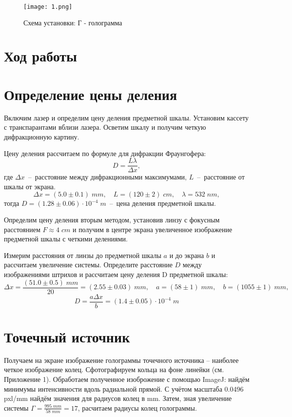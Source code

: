 \documentclass[a4paper, 12pt]{article}
\begin{document}
\begin{figure}[H]
	\centering
	\texttt{[image: 1.png]}
	\caption{Схема установки: Г - голограмма}
\end{figure}



\section*{Ход работы}
\section{Определение цены деления}
\noindent Включим лазер и определим цену деления предметной шкалы. Установим кассету с транспарантами вблизи лазера. Осветим шкалу и получим четкую дифракционную картину. 

\noindent Цену деления рассчитаем по формуле для дифракции Фраунгофера: 
\[ D = \dfrac{L\lambda}{\Delta x}, \] 
\noindent где $\Delta x$~--~расстояние между дифракционными максимумами, $L$~--~расстояние от шкалы от экрана.
\[\Delta x = (5.0\pm 0.1) \; mm, \quad L = (120\pm2) \; cm, \quad \lambda = 532 \; nm, \]
\noindent тогда $D = (1.28 \pm 0.06) \cdot 10^{-4} \; m$~--~цена деления предметной шкалы.

\noindent Определим цену деления вторым методом, установив линзу с фокусным расстоянием $F\approx4 \;cm$ и получим в центре экрана увеличенное изображение предметной шкалы с четкими делениями.

\noindent Измерим расстояния от линзы до предметной шкалы $a$ и до экрана $b$ и рассчитаем увеличение системы. Определите расстояние $D$ между изображениями штрихов и рассчитаем цену деления D предметной шкалы:
\[\Delta x = \frac{(51.0\pm0.5)\; mm}{20} = (2.55\pm0.03) \; mm , \quad a = (58\pm1) \; mm, \quad b = (1055\pm1) \; mm, \]
\[D = \dfrac{a\Delta x}{b} = (1.4 \pm 0.05) \cdot 10^{-4} \; m \]

\newpage


\section{Точечный источник}

\noindent Получаем на экране изображение голограммы точечного источника -- наиболее четкое изображение колец. Сфотографируем кольца на фоне линейки (см. Приложение 1). Обработаем полученное изоброжение с помощью ImageJ: найдём минимумы интенсивности вдоль радиальной прямой. С учётом масштаба 0.0496 pxl/mm найдём значения для радиусов колец в mm. Затем, зная увеличение системы $\Gamma = \frac{995\; mm}{58 \; mm} = 17$, расчитаем радиусы колец голограммы.
\end{document}
